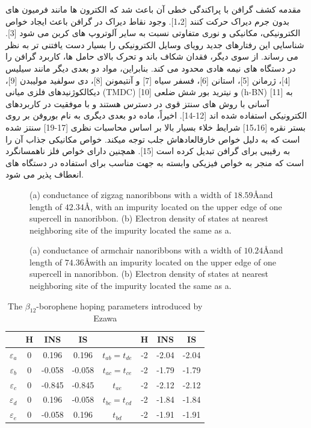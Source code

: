 مقدمه کشف گرافن با پراکندگی خطی آن باعث شد که الکترون ها مانند فرمیون های بدون جرم دیراک حرکت کنند [1،2]. وجود نقاط دیراک در گرافن باعث ایجاد خواص الکترونیکی، مکانیکی و نوری متفاوتی نسبت به سایر آلوتروپ های کربن می شود [3]. شناسایی این رفتارهای جدید رویای وسایل الکترونیکی را بسیار دست یافتنی تر به نظر می رساند. از سوی دیگر، فقدان شکاف باند و تحرک بالای حامل ها، کاربرد گرافن را در دستگاه های نیمه هادی محدود می کند. بنابراین، مواد دو بعدی دیگر مانند سیلیس [4]، ژرمانن [5]، استانن [6]، فسفر سیاه [7] و آنتیمونن [8]، دی سولفید مولیبدن [9]، دیکالکوژنیدهای فلزی میانی (TMDC) [10] و نیترید بور شش ضلعی (h-BN) [11] به آسانی با روش های سنتز قوی در دسترس هستند و با موفقیت در کاربردهای الکترونیکی استفاده شده اند [12-14]. اخیراً، ماده دو بعدی دیگری به نام بوروفن بر روی بستر نقره [15،16] شرایط خلاء بسیار بالا بر اساس محاسبات نظری [17-19] سنتز شده است که به دلیل خواص خارقالعادهاش جلب توجه میکند. خواص مکانیکی جذاب آن را به رقیبی برای گرافن تبدیل کرده است [15]. همچنین دارای خواص فلز ناهمسانگرد است که منجر به خواص فیزیکی وابسته به جهت مناسب برای استفاده در دستگاه های انعطاف پذیر می شود.
\begin{figure}[!ht]
    \centering
    
    \caption{(a) conductance of zigzag nanoribbons with a width of $18.59$\AA and 
    length of $42.34$\AA, with an impurity located on the upper edge of one supercell in nanoribbon. 
    (b) Electron density of states at nearest neighboring site of the impurity located the same as a.}
    \label{zigscatter}
  \end{figure}
  \begin{figure}[ht]
    \centering
    
    \caption{(a) conductance of armchair nanoribbons with a 
    width of $10.24$\AA and length of $74.36$\AA with an impurity located on the upper edge of one supercell in nanoribbon. 
    (b) Electron density of states at nearest neighboring site of the impurity located the same as a.}
    \label{armscatter}
  \end{figure}

  \begin{table}
    \centering
    \caption{The $\beta_{12}$-borophene hoping parameters introduced by Ezawa\cite{ezawaTripletFermionsDirac2017}\label{tbl:hoppingtable}}
    \begin{tabular}{cccccccc}
    \toprule
     & H & INS & IS &
     & H & INS & IS\\
    \midrule
    $\varepsilon_a$& 0 &  0.196 &  0.196 & $t_{ab}=t_{de}$& -2 & -2.04 & -2.04 \\
    $\varepsilon_b$& 0 & -0.058 & -0.058 & $t_{ac}=t_{ce}$& -2 & -1.79 & -1.79 \\
    $\varepsilon_c$& 0 & -0.845 & -0.845 & $t_{ae}$& -2 & -2.12 & -2.12   \\
    $\varepsilon_d$& 0 &  0.196 & -0.058 & $t_{bc}=t_{cd}$& -2 & -1.84 & -1.84 \\
    $\varepsilon_e$& 0 & -0.058 &  0.196 & $t_{bd}$& -2 & -1.91 & -1.91  \\
    \bottomrule
    \end{tabular}
    \end{table}

